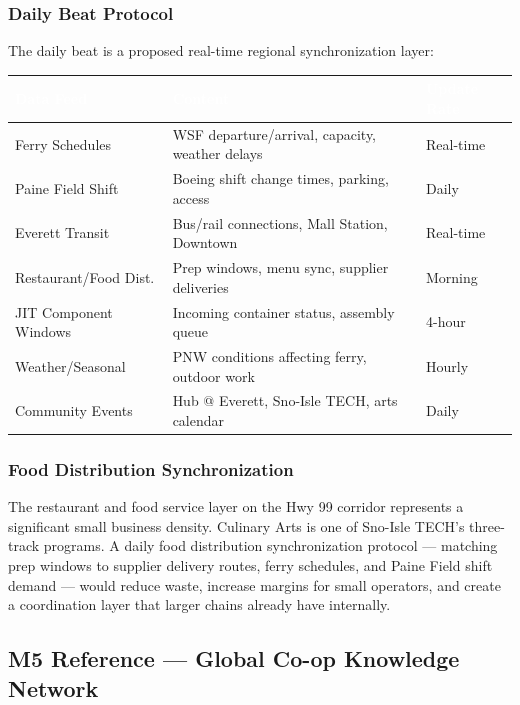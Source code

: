 \documentclass[11pt,letterpaper]{article}
\newcommand{\tableheader}[1]{\textbf{\sffamily\textcolor{white}{#1}}}
\begin{document}
\subsubsection{Daily Beat Protocol}

The daily beat is a proposed real-time regional synchronization layer:

\begin{center}
\begin{tabularx}{\textwidth}{L{3.5cm}XC{2cm}}
\toprule
{}
\tableheader{Data Feed} & \tableheader{Content} & \tableheader{Update Rate} \\
\midrule
Ferry Schedules & WSF departure/arrival, capacity, weather delays & Real-time \\
Paine Field Shift & Boeing shift change times, parking, access & Daily \\
Everett Transit & Bus/rail connections, Mall Station, Downtown & Real-time \\
Restaurant/Food Dist. & Prep windows, menu sync, supplier deliveries & Morning \\
JIT Component Windows & Incoming container status, assembly queue & 4-hour \\
Weather/Seasonal & PNW conditions affecting ferry, outdoor work & Hourly \\
Community Events & Hub @ Everett, Sno-Isle TECH, arts calendar & Daily \\
\bottomrule
\end{tabularx}
\end{center}

\subsubsection{Food Distribution Synchronization}

The restaurant and food service layer on the Hwy 99 corridor represents a significant small business density. Culinary Arts is one of Sno-Isle TECH's three-track programs. A daily food distribution synchronization protocol --- matching prep windows to supplier delivery routes, ferry schedules, and Paine Field shift demand --- would reduce waste, increase margins for small operators, and create a coordination layer that larger chains already have internally.

\subsection{M5 Reference --- Global Co-op Knowledge Network}
\end{document}
